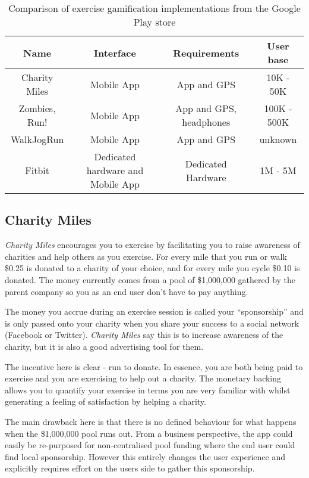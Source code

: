 \begin{table}[h]
  \centering
  \begin{tabular}{ | c | c | c | c |} \hline
    Name & Interface & Requirements & User base  \\ \hline
    Charity Miles & Mobile App & App and GPS & 10K - 50K\cite{charitymiles_store}\\ \hline
    Zombies, Run! & Mobile App & App and GPS, headphones & 100K - 500K\cite{zombiesrun_store}\\ \hline
    WalkJogRun & Mobile App & App and GPS  & unknown \\ \hline
    Fitbit & Dedicated hardware and Mobile App & Dedicated Hardware & 1M - 5M\cite{fitbit_store}\\ \hline
  \end{tabular}
  \caption{Comparison of exercise gamification implementations from
    the Google Play store}
  \label{table:competitor_comparison}
\end{table}

\subsection{Charity Miles}
\label{sec:charity_miles}
\emph{Charity Miles} encourages you to exercise by facilitating you to raise
awareness of charities and help
others as you exercise. For every mile that you run or walk \$0.25 is
donated to a charity of your choice, and for every mile you cycle \$0.10
is donated. The money currently comes from a pool of \$1,000,000
gathered by the parent company so you as an end user don't have to pay
anything. 

The money you accrue during an exercise session is called your
``sponsorship'' and is only passed onto your charity when you share
your success to a social network (Facebook or
Twitter)\cite{charitymiles_terms}. \emph{Charity Miles} say this is to
increase awareness of the charity, but it is also a good advertising
tool for them.

The incentive here is clear - run to donate. In essence, you are both
being paid to exercise and you are exercising to help out a
charity. The monetary backing allows you to quantify your exercise in
terms you are very familiar with whilst generating a feeling of
satisfaction by helping a charity.

The main drawback here is that there is no defined behaviour for what
happens when the \$1,000,000 pool runs out. From a business
perspective, the app could easily be re-purposed for non-centralised
pool funding where the end user could find local sponsorship. However
this entirely changes the user experience and explicitly requires
effort on the users side to gather this sponsorship. 

